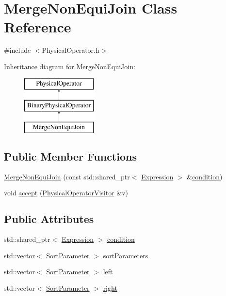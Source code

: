 \hypertarget{class_merge_non_equi_join}{\section{Merge\+Non\+Equi\+Join Class Reference}
\label{class_merge_non_equi_join}
}


{\ttfamily \#include $<$Physical\+Operator.\+h$>$}

Inheritance diagram for Merge\+Non\+Equi\+Join\+:\begin{figure}[H]
\begin{center}
\leavevmode
\includegraphics[height=3.000000cm]{class_merge_non_equi_join}
\end{center}
\end{figure}
\subsection*{Public Member Functions}
\begin{DoxyCompactItemize}
\item 
\hyperlink{class_merge_non_equi_join_a3e7a12e0e21a2bf755608c9bc2e5d4ed}{Merge\+Non\+Equi\+Join} (const std\+::shared\+\_\+ptr$<$ \hyperlink{class_expression}{Expression} $>$ \&\hyperlink{class_merge_non_equi_join_ad1307cbe8f5e88f685ece833fcea67c2}{condition})
\item 
void \hyperlink{class_merge_non_equi_join_a117ec79e9941977b4f90c65bea5cea65}{accept} (\hyperlink{class_physical_operator_visitor}{Physical\+Operator\+Visitor} \&v)
\end{DoxyCompactItemize}
\subsection*{Public Attributes}
\begin{DoxyCompactItemize}
\item 
std\+::shared\+\_\+ptr$<$ \hyperlink{class_expression}{Expression} $>$ \hyperlink{class_merge_non_equi_join_ad1307cbe8f5e88f685ece833fcea67c2}{condition}
\item 
std\+::vector$<$ \hyperlink{class_sort_parameter}{Sort\+Parameter} $>$ \hyperlink{class_merge_non_equi_join_a5f8b68c20d65ec2e07f41f2c2c4079d6}{sort\+Parameters}
\item 
std\+::vector$<$ \hyperlink{class_sort_parameter}{Sort\+Parameter} $>$ \hyperlink{class_merge_non_equi_join_a785b0aeaa5ec15536c03272a21f8ebe0}{left}
\item 
std\+::vector$<$ \hyperlink{class_sort_parameter}{Sort\+Parameter} $>$ \hyperlink{class_merge_non_equi_join_ae3631adf9752e5ab861dbf986b92ff00}{right}
\end{DoxyCompactItemize}



